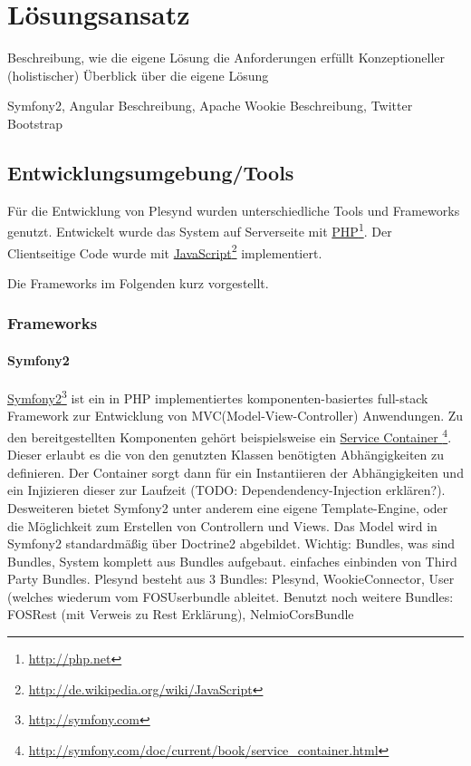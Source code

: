\chapter{Lösungsansatz} 
\label{Kapitel 5}
Beschreibung, wie die eigene Lösung die Anforderungen erfüllt
Konzeptioneller (holistischer) Überblick über die eigene Lösung

Symfony2, Angular Beschreibung, Apache Wookie Beschreibung, Twitter Bootstrap

\section{Entwicklungsumgebung/Tools}
Für die Entwicklung von Plesynd wurden unterschiedliche Tools und Frameworks genutzt. Entwickelt wurde das System auf Serverseite mit \href{http://php.net}{PHP}\footnote{\url{http://php.net}}. Der Clientseitige Code wurde mit \href{http://de.wikipedia.org/wiki/JavaScript}{JavaScript}\footnote{\url{http://de.wikipedia.org/wiki/JavaScript}} implementiert. 

Die Frameworks im Folgenden kurz vorgestellt.

\subsection{Frameworks}

\subsubsection{Symfony2}
\href{http://symfony.com}{Symfony2}\footnote{\url{http://symfony.com}} ist ein in PHP implementiertes komponenten-basiertes full-stack Framework zur Entwicklung von MVC(Model-View-Controller) Anwendungen. Zu den bereitgestellten Komponenten gehört beispielsweise ein \href{http://symfony.com/doc/current/book/service_container.html}{Service Container }\footnote{\url{http://symfony.com/doc/current/book/service_container.html}}. Dieser erlaubt es die von den genutzten Klassen benötigten Abhängigkeiten zu definieren. Der Container sorgt dann für ein Instantiieren der Abhängigkeiten und ein Injizieren dieser zur Laufzeit (TODO: Dependendency-Injection erklären?). Desweiteren bietet Symfony2 unter anderem eine eigene Template-Engine, oder die Möglichkeit zum Erstellen von Controllern und Views. Das Model wird in Symfony2 standardmäßig über Doctrine2 abgebildet.
Wichtig: Bundles, was sind Bundles, System komplett aus Bundles aufgebaut. einfaches einbinden von Third Party Bundles. Plesynd besteht aus 3 Bundles: Plesynd, WookieConnector, User (welches wiederum vom FOSUserbundle ableitet. Benutzt noch weitere Bundles: FOSRest (mit Verweis zu Rest Erklärung), NelmioCorsBundle



